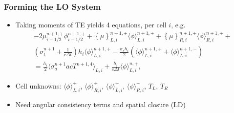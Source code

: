 \documentclass[xcolor=dvipsnames,hyperref={pdfpagelabels=false},unknownkeysallowed]{beamer}
\newcommand{\colb}[1]{{\color{blue} #1}}
\newlength{\wideitemsep}
\let\olditem\item
\renewcommand{\item}{\setlength{\itemsep}{\wideitemsep}\olditem}
\newcommand{\mom}[1]{\langle #1 \rangle}
\newcommand{\cur}[1]{\left\{ #1 \right\}}
\begin{document}
\begin{frame}
    \frametitle{Forming the LO System}
    \begin{itemize}
        \item Taking moments of TE yields \colb{4 equations}, per cell $i$, e.g.
\begin{multline}\label{lo_tran}
    -2{\mu}_{i-1/2}^{n+1,+} \phi_{i-1/2}^{n+1,+} + \cur {\mu}_{L,i}^{n+1,+}
  \mom{\phi}_{L,i}^{n+1,+}
  +  \cur\mu_{R,i}^{n+1,+}
  \mom{\phi}_{R,i}^{n+1,+} +  \\ \left(\sigma_t^{n+1}+\frac{1}{c \Delta t} \right) h_i 
  \mom{\phi}_{L,i}^{n+1,+} -  \frac{\sigma_s h_i}{2} \left( \mom{\phi}_{L,i}^{n+1,+} +
  \mom\phi_{L,i}^{n+1,-}\right) \\ = \frac{h_i}{2} \mom{\sigma_a^{n+1} a c T^{n+1,4}}_{L,i} +
  \frac{h_i}{c\Delta t}\mom{\phi}_{L,i}^{n,+},
\end{multline}
        \item Cell unknowns: $\mom{\phi}_{L,i}^{+}$, $\mom{\phi}_{R,i}^{+}$,
        $\mom{\phi}_{L,i}^{-}$, $\mom{\phi}_{R,i}^{-}$, $T_L$, $T_R$

    \item Need \colb{angular} consistency terms  and spatial closure
        (LD)
    \end{itemize}

\end{frame}




\setcounter{framenumber}{\value{finalframe}}
\end{document}

